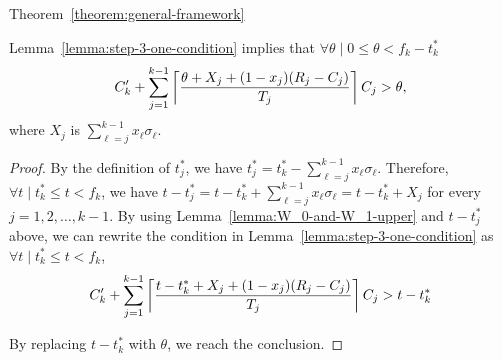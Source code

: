 \begin{appProof}{Theorem~\ref{theorem:general-framework}}
\begin{Lemma}
\label{lemma:step-3-ceiling-condition}
Lemma~\ref{lemma:step-3-one-condition} implies that
$\forall \theta \mid 0 \leq \theta < f_k-t_k^*$
\begin{equation}
\label{eq:exec_plus_idle-almost-final-before-replacing-sigma} 
C_k'+\sum_{j=1}^{k-1} \ceiling{\frac{\theta+X_j+(1-x_j)(R_j-C_j)}{T_j}} C_j > \theta,
\end{equation}
where $X_j$ is $\sum_{\ell=j}^{k-1} x_\ell\sigma_\ell$. 
\end{Lemma}
\begin{proof}
  By the definition of $t_j^*$, we have $t_j^* = t_k^* - \sum_{\ell=j}^{k-1}
  x_\ell\sigma_\ell$. Therefore, $\forall t \mid t_k^* \leq t < f_k$,
  we have $t-t_j^* = t - t_k^* + \sum_{\ell=j}^{k-1}
  x_\ell\sigma_\ell = t-t_k^* + X_j$ for every $j=1,2,\ldots,k-1$. By using Lemma~\ref{lemma:W_0-and-W_1-upper} and $t-t_j^*$ above, we can rewrite the condition in Lemma~\ref{lemma:step-3-one-condition} as $\forall t \mid t_k^* \leq t < f_k$,
\begin{equation*}
C_k'+\sum_{j=1}^{k-1} \left\lceil{\frac{t-t_k^*+X_j+(1-x_j)(R_j-C_j)}{T_j}}\right\rceil C_j > t-t_k^*
\end{equation*}

  By replacing $t-t_k^*$ with $\theta$, we reach the conclusion.
\end{proof}



\end{appProof}
